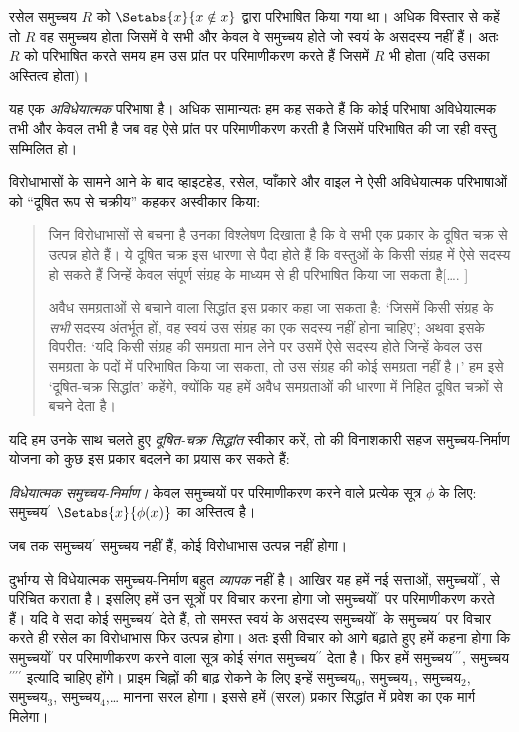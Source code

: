 \documentclass[../../../include/open-logic-section]{subfiles}
\begin{document}


रसेल समुच्चय $R$ को $\Setabs{x}{x \notin x}$ द्वारा परिभाषित किया गया
था। अधिक विस्तार से कहें तो $R$ वह समुच्चय होता जिसमें वे सभी और केवल वे
समुच्चय होते जो स्वयं के असदस्य नहीं हैं। अतः $R$ को परिभाषित करते समय हम
उस प्रांत पर परिमाणीकरण करते हैं जिसमें $R$ भी होता (यदि उसका अस्तित्व
होता)।

यह एक \emph{अविधेयात्मक} परिभाषा है। अधिक सामान्यतः हम कह सकते हैं कि कोई
परिभाषा अविधेयात्मक तभी और केवल तभी है जब वह ऐसे प्रांत पर परिमाणीकरण करती
है जिसमें परिभाषित की जा रही वस्तु सम्मिलित हो।
	
विरोधाभासों के सामने आने के बाद व्हाइटहेड, रसेल, प्वाँकारे और वाइल ने ऐसी
अविधेयात्मक परिभाषाओं को ``दूषित रूप से चक्रीय'' कहकर अस्वीकार किया:
\begin{quote}
	जिन विरोधाभासों से बचना है उनका विश्लेषण दिखाता है कि वे सभी एक प्रकार
	के दूषित चक्र से उत्पन्न होते हैं। ये दूषित चक्र इस धारणा से पैदा होते
	हैं कि वस्तुओं के किसी संग्रह में ऐसे सदस्य हो सकते हैं जिन्हें केवल
	संपूर्ण संग्रह के माध्यम से ही परिभाषित किया जा सकता है[\ldots.
	\textparagraph]

	अवैध समग्रताओं से बचाने वाला सिद्धांत इस प्रकार कहा जा सकता है: `जिसमें
	किसी संग्रह के \emph{सभी} सदस्य अंतर्भूत हों, वह स्वयं उस संग्रह का एक
	सदस्य नहीं होना चाहिए'; अथवा इसके विपरीत: `यदि किसी संग्रह की समग्रता
	मान लेने पर उसमें ऐसे सदस्य होते जिन्हें केवल उस समग्रता के पदों में
	परिभाषित किया जा सकता, तो उस संग्रह की कोई समग्रता नहीं है।' हम इसे
	`दूषित-चक्र सिद्धांत' कहेंगे, क्योंकि यह हमें अवैध समग्रताओं की धारणा में
	निहित दूषित चक्रों से बचने देता है।
	\citep[p.~37]{WhiteheadRussell1910}
\end{quote}
यदि हम उनके साथ चलते हुए \emph{दूषित-चक्र सिद्धांत} स्वीकार करें, तो
 की विनाशकारी सहज समुच्चय-निर्माण योजना को कुछ
इस प्रकार बदलने का प्रयास कर सकते हैं:

\begin{defish}
\emph{विधेयात्मक समुच्चय-निर्माण।} केवल समुच्चयों पर परिमाणीकरण करने वाले
प्रत्येक सूत्र $\phi$ के लिए: समुच्चय$^\prime$
$\Setabs{x}{\phi(x)}$ का अस्तित्व है।
\end{defish}

जब तक समुच्चय$^{\prime}$ समुच्चय नहीं हैं, कोई विरोधाभास उत्पन्न नहीं होगा।

दुर्भाग्य से विधेयात्मक समुच्चय-निर्माण बहुत \emph{व्यापक} नहीं है। आखिर
यह हमें नई सत्ताओं, समुच्चयों$^\prime$, से परिचित कराता है। इसलिए हमें उन
सूत्रों पर विचार करना होगा जो समुच्चयों$^\prime$ पर परिमाणीकरण करते हैं। यदि
वे सदा कोई समुच्चय$^\prime$ देते हैं, तो समस्त स्वयं के असदस्य
समुच्चयों$^\prime$ के समुच्चय$^\prime$ पर विचार करते ही रसेल का विरोधाभास
फिर उत्पन्न होगा। अतः इसी विचार को आगे बढ़ाते हुए हमें कहना होगा कि
समुच्चयों$^\prime$ पर परिमाणीकरण करने वाला सूत्र कोई संगत
समुच्चय$^{\prime\prime}$ देता है। फिर हमें समुच्चय$^{\prime\prime\prime}$,
समुच्चय$^{\prime\prime\prime\prime}$ इत्यादि चाहिए होंगे। प्राइम चिह्नों की
बाढ़ रोकने के लिए इन्हें समुच्चय$_0$, समुच्चय$_1$, समुच्चय$_2$,
समुच्चय$_3$, समुच्चय$_4$,\ldots{} मानना सरल होगा। इससे हमें (सरल) प्रकार
सिद्धांत में प्रवेश का एक मार्ग मिलेगा।
\end{document}
